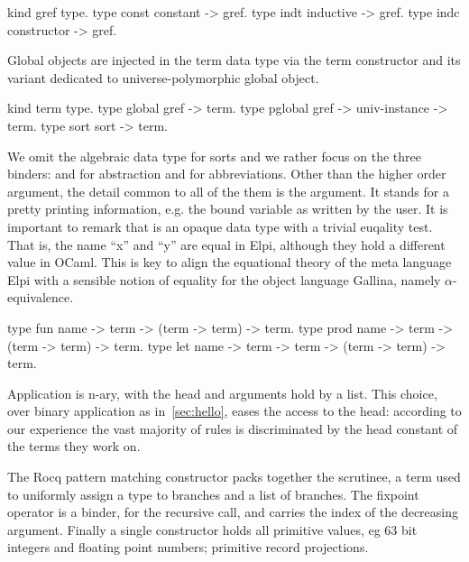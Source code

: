 \documentclass[a4paper, 11pt]{book}
\begin{document}
\begin{elpicode}
kind gref type.
type const constant -> gref.            %
type indt  inductive -> gref.           %
type indc  constructor -> gref.         %
\end{elpicode}

Global objects are injected in the term data type via the
 term constructor and its variant
 dedicated to universe-polymorphic global
object.

\begin{elpicode}
kind term type.
type global  gref -> term.
type pglobal gref -> univ-instance -> term.
type sort    sort -> term.                 %
\end{elpicode}

We omit the algebraic data type for sorts and we rather focus on the
three binders:  and  for abstraction
and  for abbreviations.
Other than the higher order argument, the detail common
to all of the them is the  argument. It stands for
a pretty printing information, e.g. the bound variable as written by
the user. It is important to remark that  is
an opaque data type with a trivial euqality test. That is, the
name ``x'' and ``y'' are equal in Elpi, although they hold a
different value in OCaml. This is key to align the equational theory
of the meta language Elpi with a sensible notion of equality for
the object language Gallina, namely $\alpha$-equivalence.

\begin{elpicode}
type fun  name -> term -> (term -> term) -> term.            %
type prod name -> term -> (term -> term) -> term.            %
type let  name -> term -> term -> (term -> term) -> term.    %
\end{elpicode}

Application is n-ary, with the head and arguments hold by a list.
This choice, over binary application as in~\cref{sec:hello}, eases
the access to the head: according to our experience the vast majority
of rules is discriminated by the head constant of the terms they work on.

The Rocq pattern matching constructor packs together the scrutinee,
a term used to uniformly assign a type to branches and a list of
branches. The fixpoint operator is a binder, for the recursive call,
and carries the index of the decreasing argument. Finally a single
constructor holds all primitive values, eg 63 bit integers and floating
point numbers; primitive record projections.
\end{document}
